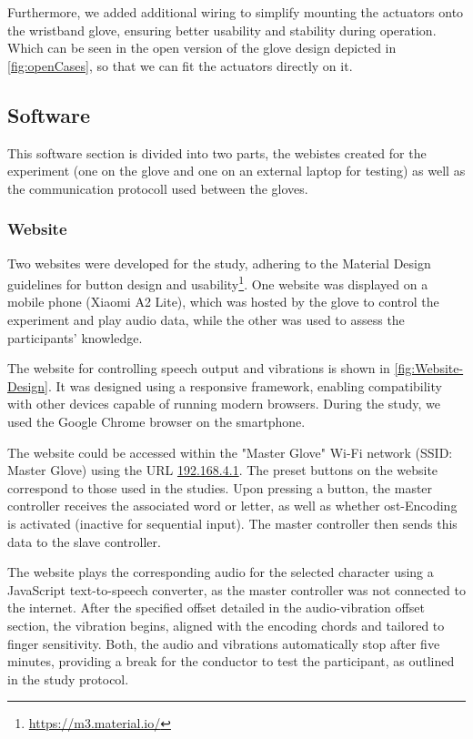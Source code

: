 Furthermore, we added additional wiring to simplify mounting the actuators onto the wristband glove, ensuring better usability and stability during operation.
Which can be seen in the open version of the glove design depicted in \autoref{fig:openCases}, so that we can fit the actuators directly on it.




\subsection{Software}

This software section is divided into two parts, the webistes created for the experiment (one on the glove and one on an external laptop for testing) as well as the communication protocoll used between the gloves.



\subsubsection{Website}
\label{sub:website}
Two websites were developed for the study, adhering to the Material Design guidelines for button design and usability\footnote{\url{https://m3.material.io/}}. One website was displayed on a mobile phone (Xiaomi A2 Lite), which was hosted by the glove to control the experiment and play audio data, while the other was used to assess the participants' knowledge.

The website for controlling speech output and vibrations is shown in \autoref{fig:Website-Design}. It was designed using a responsive framework, enabling compatibility with other devices capable of running modern browsers. During the study, we used the Google Chrome browser on the smartphone.

The website could be accessed within the "Master Glove" Wi-Fi network (SSID: Master Glove) using the URL \url{192.168.4.1}.
The preset buttons on the website correspond to those used in the studies.
Upon pressing a button, the master controller receives the associated word or letter, as well as whether \gls{ost}-Encoding is activated (inactive for sequential input).
The master controller then sends this data to the slave controller.

The website plays the corresponding audio for the selected character using a JavaScript text-to-speech converter, as the master controller was not connected to the internet.
After the specified offset detailed in the audio-vibration offset section, the vibration begins, aligned with the encoding chords and tailored to finger sensitivity.
Both, the audio and vibrations automatically stop after five minutes, providing a break for the conductor to test the participant, as outlined in the study protocol.

